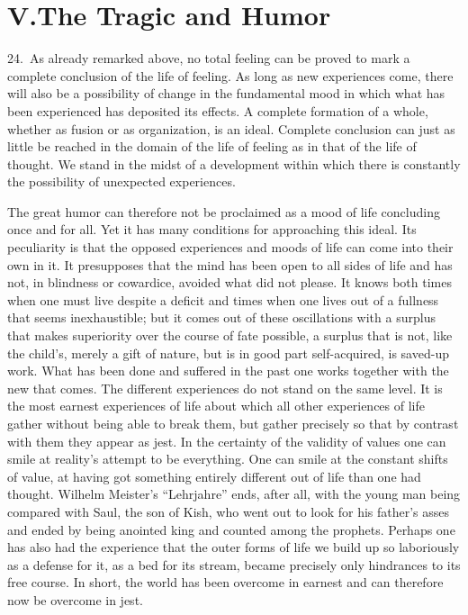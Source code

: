 \documentclass[12pt]{book}
\newcommand{\opage}[1]{\marginnote{\footnotesize\textit{[#1]}}}
\begin{document}
\chapter*{V.\quad The Tragic and Humor}
\opage{88}24.~As already remarked above, no total feeling can be proved to mark a
complete conclusion of the life of feeling. As long as new experiences come, there
will also be a possibility of change in the fundamental mood in which what has been
experienced has deposited its effects. A complete formation of a whole, whether as
fusion or as organization, is an ideal. Complete conclusion can just as little be
reached in the domain of the life of feeling as in that of the life of thought. We
stand in the midst of a development within which there is constantly the possibility
of unexpected experiences.

The great humor can therefore not be proclaimed as a mood of life concluding once and
for all. Yet it has many conditions for approaching this ideal. Its peculiarity is
that the opposed experiences and moods of life can come into their own in it. It
presupposes that the mind has been open to all sides of life and has not, in
blindness or cowardice, avoided what did not please. It knows both times when one must
live despite a deficit and times when one lives out of a fullness that seems
inexhaustible; but it comes out of these oscillations with a surplus that makes
superiority over the course of fate possible, a surplus that is not, like the child's,
merely a gift of nature, but is in good part self-acquired, is saved-up work. What has
been done and suffered in the past one works together with the new that comes. The
different experiences do not stand on the same level. It is the most earnest
experiences of life about which all other experiences of life gather without being
able to break them, but gather precisely so that by contrast with them they appear as
jest. In the certainty of the validity of values one can smile at reality's attempt to
be everything. One can smile at the constant \opage{89}shifts of value, at having got
something entirely different out of life than one had thought. Wilhelm Meister's
``Lehrjahre'' ends, after all, with the young man being compared with Saul, the son of
Kish, who went out to look for his father's asses and ended by being anointed king and
counted among the prophets. Perhaps one has also had the experience that the outer
forms of life we build up so laboriously as a defense for it, as a bed for its stream,
became precisely only hindrances to its free course. In short, the world has been
overcome in earnest and can therefore now be overcome in jest.
\end{document}
